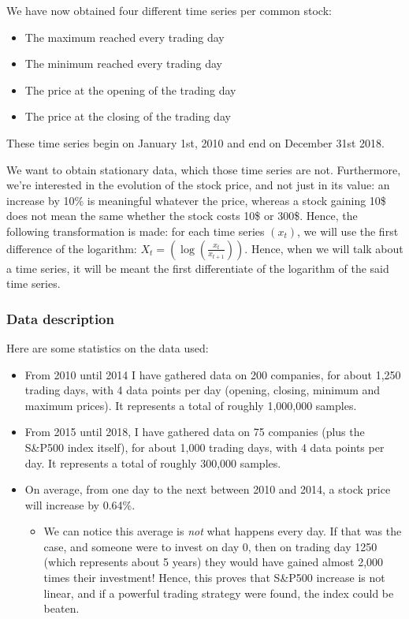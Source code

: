 \documentclass[11pt]{article}
\begin{document}
\begin{onehalfspace}
We have now obtained four different time series per common stock:

\begin{itemize}
    \item The maximum reached every trading day
    \item The minimum reached every trading day
    \item The price at the opening of the trading day
    \item The price at the closing of the trading day
\end{itemize}

These time series begin on January 1st, 2010 and end on December 31st 2018.

We want to obtain stationary data\cite{stationary}, which those time series are not. Furthermore, we're interested in the evolution of the stock price, and not just in its value: an increase by 10\% is meaningful whatever the price, whereas a stock gaining 10\$ does not mean the same whether the stock costs 10\$ or 300\$. Hence, the following transformation is made: for each time series $(x_t)$, we will use the first difference of the logarithm: $X_t = \left(\log\left(\frac{x_t}{x_{t+1}}\right)\right)$. Hence, when we will talk about a time series, it will be meant the first differentiate of the logarithm of the said time series.

\subsubsection{Data description}
Here are some statistics on the data used:

\begin{itemize}
    \item From 2010 until 2014 I have gathered data on 200 companies, for about 1,250 trading days, with 4 data points per day (opening, closing, minimum and maximum prices). It represents a total of roughly 1,000,000 samples.
    
    \item From 2015 until 2018, I have gathered data on 75 companies (plus the S\&P500 index itself), for about 1,000 trading days, with 4 data points per day. It represents a total of roughly 300,000 samples.
    
    \item On average, from one day to the next between 2010 and 2014, a stock price will increase by 0.64\%.
    \begin{itemize}
        \item We can notice this average is \emph{not} what happens every day. If that was the case, and someone were to invest on day 0, then on trading day 1250 (which represents about 5 years) they would have gained almost 2,000 times their investment! Hence, this proves that S\&P500 increase is not linear, and if a powerful trading strategy were found, the index could be beaten.
    \end{itemize}


\end{itemize}
\end{onehalfspace}
\end{document}
